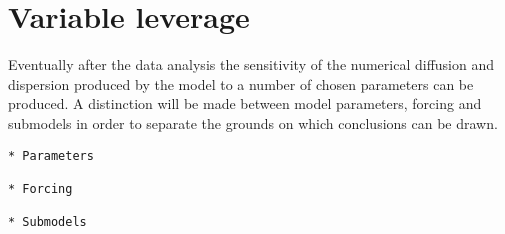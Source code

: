 \section{Variable leverage}\label{variable-leverage}

Eventually after the data analysis the sensitivity of the numerical
diffusion and dispersion produced by the model to a number of chosen
parameters can be produced. A distinction will be made between model
parameters, forcing and submodels in order to separate the grounds on
which conclusions can be drawn.

\begin{verbatim}
* Parameters

* Forcing 

* Submodels
\end{verbatim}
